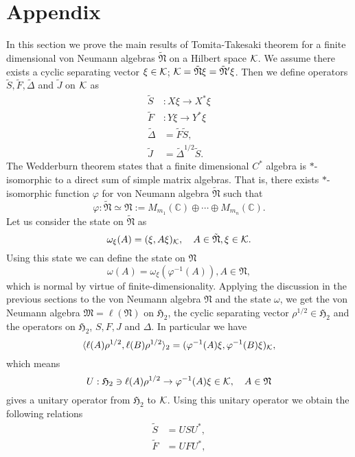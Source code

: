 \documentclass{article}
\begin{document}
\section{Appendix}
In this section we prove the main results of Tomita-Takesaki theorem for a finite dimensional
von Neumann algebras $\tilde{\mathfrak{N}}$ on a Hilbert space $\cal{K}$.
We assume there exists a cyclic separating vector $\xi\in \cal{K}$;
$\cal{K}=\tilde{\mathfrak{N}}\xi=\tilde{\mathfrak{N}}^\prime\xi$.
Then we define operators $\tilde{S},\tilde{F},\tilde{\Delta}$ and $\tilde{J}$ on $\cal{K}$ as
\begin{equation}
\begin{split}
\tilde{S}&:X\xi \to X^\ast \xi \\
\tilde{F}&:Y\xi \to Y^\ast \xi \\
\tilde{\Delta}&=\tilde{F}\tilde{S},\\
\tilde{J}&=\tilde{\Delta}^{1/2}\tilde{S}.
\end{split}
\end{equation}
The Wedderburn theorem states that a finite dimensional $C^{\ast}$ algebra is  $\ast$-isomorphic to a direct sum of simple matrix algebras. That is, there exists $\ast$-isomorphic function $\varphi$ for von Neumann algebra $\tilde{\mathfrak{N}}$ such that
$$
\varphi:\tilde{\mathfrak{N}}\simeq \mathfrak{N}:=M_{m_1}(\mathbb{C})\oplus \cdots \oplus M_{m_n}(\mathbb{C}).
$$
Let us consider the state on $\tilde{\mathfrak{N}}$ as
$$
\omega_\xi(A)=(\xi,A\xi)_{\cal K},\quad A\in \tilde{\mathfrak{N}},\xi\in \cal{K}.
$$
Using this state we can define the state on $\mathfrak{N}$
$$
\omega(A)=\omega_\xi(\varphi^{-1}(A)),A\in \mathfrak{N},
$$
which is normal by virtue of finite-dimensionality.
Applying the discussion in the previous sections to the von Neumann algebra $\mathfrak{N}$ and the state
$\omega$, we get
the von Neumann algebra $\mathfrak{M}=\ell (\mathfrak{N})$ on  
$\mathfrak{H}_2$, the cyclic separating vector $\rho^{1/2}\in \mathfrak{H}_2$
and the operators on $\mathfrak{H}_2$, $S, F, J$ and $\Delta$.
In particular we have
$$
\langle \ell(A)\rho^{1/2},\ell( B)\rho^{1/2}\rangle_2=(\varphi^{-1}(A)\xi,\varphi^{-1}(B)\xi)_{\cal K},
$$
which means
$$
U:\mathfrak{H}_2\ni\ell(A)\rho^{1/2}\to \varphi^{-1}(A)\xi\in {\cal K}, \quad A\in \mathfrak{N}
$$
gives a unitary operator from $\mathfrak{H}_2$ to ${\cal K}$.
Using this unitary operator we obtain the following relations
\begin{equation}
\begin{split}
\tilde{S}&=US U^{\ast},\\
\tilde{F}&=UFU^\ast ,
\end{split}
\end{equation}
\end{document}
